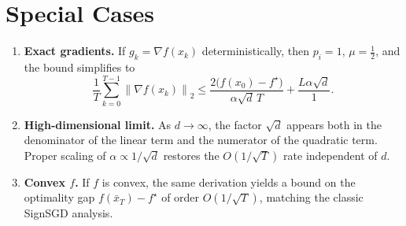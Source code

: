 \documentclass{article}
\newcommand{\norm}[1]{\left\lVert#1\right\rVert}
\begin{document}
\section*{Special Cases}
\begin{enumerate}[label=\alph*.]
\item \textbf{Exact gradients.} If $g_k=\nabla f(x_k)$ deterministically, then $p_i=1$,
$\mu=\tfrac12$, and the bound simplifies to
\[
\frac{1}{T}\sum_{k=0}^{T-1}\norm{\nabla f(x_k)}_2
\le \frac{2\bigl(f(x_0)-f^\star\bigr)}{\alpha\sqrt d\,T}
+\frac{L\alpha\sqrt d}{1}.
\]
\item \textbf{High‑dimensional limit.} As $d\to\infty$, the factor $\sqrt d$ appears both in the
denominator of the linear term and the numerator of the quadratic term.  Proper scaling of
$\alpha\propto 1/\sqrt d$ restores the $O(1/\sqrt T)$ rate independent of $d$.
\item \textbf{Convex $f$.} If $f$ is convex, the same derivation yields a bound on the
optimality gap $f(\bar x_T)-f^\star$ of order $O(1/\sqrt T)$, matching the classic SignSGD analysis.
\end{enumerate}
\end{document}
